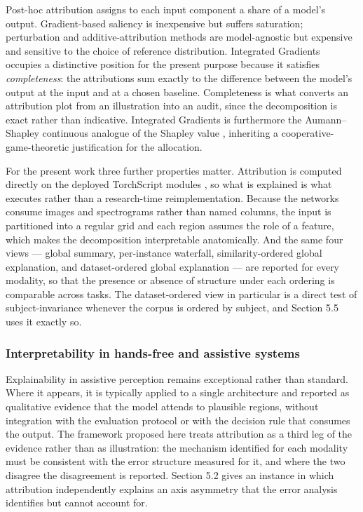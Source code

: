 Post-hoc attribution assigns to each input component a share of a model's output. Gradient-based saliency  is inexpensive but suffers saturation; perturbation and additive-attribution methods  are model-agnostic but expensive and sensitive to the choice of reference distribution. Integrated Gradients  occupies a distinctive position for the present purpose because it satisfies \emph{completeness}: the attributions sum exactly to the difference between the model's output at the input and at a chosen baseline. Completeness is what converts an attribution plot from an illustration into an audit, since the decomposition is exact rather than indicative. Integrated Gradients is furthermore the Aumann--Shapley  continuous analogue of the Shapley value , inheriting a cooperative-game-theoretic justification for the allocation.

For the present work three further properties matter. Attribution is computed directly on the deployed TorchScript modules , so what is explained is what executes rather than a research-time reimplementation. Because the networks consume images and spectrograms rather than named columns, the input is partitioned into a regular grid and each region assumes the role of a feature, which makes the decomposition interpretable anatomically. And the same four views --- global summary, per-instance waterfall, similarity-ordered global explanation, and dataset-ordered global explanation --- are reported for every modality, so that the presence or absence of structure under each ordering is comparable across tasks. The dataset-ordered view in particular is a direct test of subject-invariance whenever the corpus is ordered by subject, and Section 5.5 uses it exactly so.

\subsubsection{Interpretability in hands-free and assistive systems}

Explainability in assistive perception remains exceptional rather than standard. Where it appears, it is typically applied to a single architecture and reported as qualitative evidence that the model attends to plausible regions, without integration with the evaluation protocol or with the decision rule that consumes the output. The framework proposed here treats attribution as a third leg of the evidence rather than as illustration: the mechanism identified for each modality must be consistent with the error structure measured for it, and where the two disagree the disagreement is reported. Section 5.2 gives an instance in which attribution independently explains an axis asymmetry that the error analysis identifies but cannot account for.

